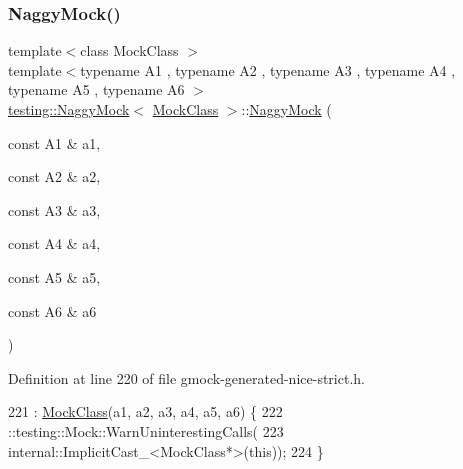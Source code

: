 \subsubsection{\texorpdfstring{Naggy\+Mock()}{NaggyMock()}\hspace{0.1cm}{\footnotesize\ttfamily [7/11]}}
{\footnotesize\ttfamily template$<$class Mock\+Class $>$ \\
template$<$typename A1 , typename A2 , typename A3 , typename A4 , typename A5 , typename A6 $>$ \\
\hyperlink{classtesting_1_1NaggyMock}{testing\+::\+Naggy\+Mock}$<$ \hyperlink{classMockClass}{Mock\+Class} $>$\+::\hyperlink{classtesting_1_1NaggyMock}{Naggy\+Mock} (\begin{DoxyParamCaption}\item[{const A1 \&}]{a1,  }\item[{const A2 \&}]{a2,  }\item[{const A3 \&}]{a3,  }\item[{const A4 \&}]{a4,  }\item[{const A5 \&}]{a5,  }\item[{const A6 \&}]{a6 }\end{DoxyParamCaption})\hspace{0.3cm}{\ttfamily [inline]}}



Definition at line 220 of file gmock-\/generated-\/nice-\/strict.\+h.


\begin{DoxyCode}
221                                   : \hyperlink{classMockClass}{MockClass}(a1, a2, a3, a4, a5, a6) \{
222     ::testing::Mock::WarnUninterestingCalls(
223         internal::ImplicitCast\_<MockClass*>(\textcolor{keyword}{this}));
224   \}
\end{DoxyCode}
\mbox{\label{classtesting_1_1NaggyMock_ad1edac1991dd20514e822c90d6896c74}} 
